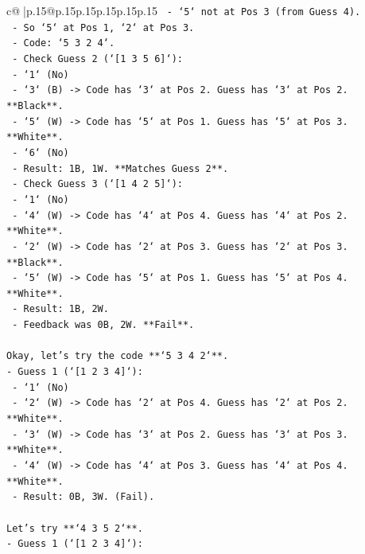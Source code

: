 \documentclass{article}
\begin{document}
{\begin{supertabular}{c@{$\;$}|p{.15\linewidth}@{}p{.15\linewidth}p{.15\linewidth}p{.15\linewidth}p{.15\linewidth}p{.15\linewidth}}
{{{\texttt{    {-}   `5` not at Pos 3 (from Guess 4).} \\
\texttt{    {-}   So `5` at Pos 1, `2` at Pos 3.} \\
\texttt{    {-}   Code: `5 3 2 4`.} \\
\texttt{    {-}   Check Guess 2 (`{[}1 3 5 6{]}`):} \\
\texttt{        {-}   `1` (No)} \\
\texttt{        {-}   `3` (B) {-}> Code has `3` at Pos 2. Guess has `3` at Pos 2. **Black**.} \\
\texttt{        {-}   `5` (W) {-}> Code has `5` at Pos 1. Guess has `5` at Pos 3. **White**.} \\
\texttt{        {-}   `6` (No)} \\
\texttt{        {-}   Result: 1B, 1W. **Matches Guess 2**.} \\
\texttt{    {-}   Check Guess 3 (`{[}1 4 2 5{]}`):} \\
\texttt{        {-}   `1` (No)} \\
\texttt{        {-}   `4` (W) {-}> Code has `4` at Pos 4. Guess has `4` at Pos 2. **White**.} \\
\texttt{        {-}   `2` (W) {-}> Code has `2` at Pos 3. Guess has `2` at Pos 3. **Black**.} \\
\texttt{        {-}   `5` (W) {-}> Code has `5` at Pos 1. Guess has `5` at Pos 4. **White**.} \\
\texttt{        {-}   Result: 1B, 2W.} \\
\texttt{        {-}   Feedback was 0B, 2W. **Fail**.} \\
\\ 
\texttt{Okay, let's try the code **`5 3 4 2`**.} \\
\texttt{{-}   Guess 1 (`{[}1 2 3 4{]}`):} \\
\texttt{    {-}   `1` (No)} \\
\texttt{    {-}   `2` (W) {-}> Code has `2` at Pos 4. Guess has `2` at Pos 2. **White**.} \\
\texttt{    {-}   `3` (W) {-}> Code has `3` at Pos 2. Guess has `3` at Pos 3. **White**.} \\
\texttt{    {-}   `4` (W) {-}> Code has `4` at Pos 3. Guess has `4` at Pos 4. **White**.} \\
\texttt{    {-}   Result: 0B, 3W. (Fail).} \\
\\ 
\texttt{Let's try **`4 3 5 2`**.} \\
\texttt{{-}   Guess 1 (`{[}1 2 3 4{]}`):} \\
}}}
\end{supertabular}}
\end{document}
